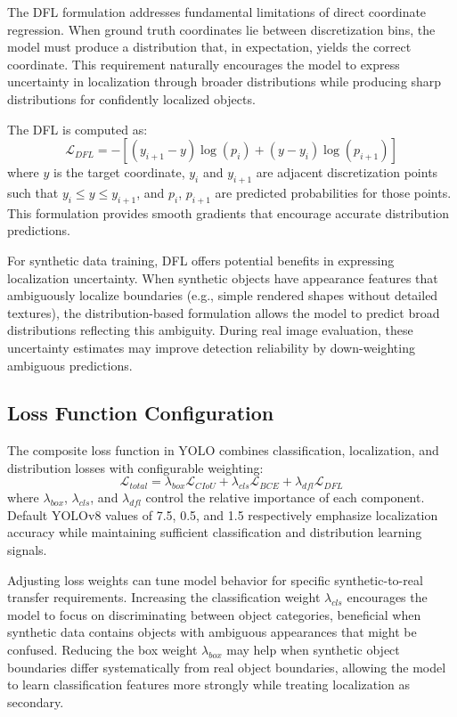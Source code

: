 The DFL formulation addresses fundamental limitations of direct coordinate regression. When ground truth coordinates lie between discretization bins, the model must produce a distribution that, in expectation, yields the correct coordinate. This requirement naturally encourages the model to express uncertainty in localization through broader distributions while producing sharp distributions for confidently localized objects.

The DFL is computed as:
\begin{equation}
\mathcal{L}_{DFL} = -[(y_{i+1} - y) \log(p_i) + (y - y_i) \log(p_{i+1})]
\end{equation}
where $y$ is the target coordinate, $y_i$ and $y_{i+1}$ are adjacent discretization points such that $y_i \leq y \leq y_{i+1}$, and $p_i$, $p_{i+1}$ are predicted probabilities for those points. This formulation provides smooth gradients that encourage accurate distribution predictions.

For synthetic data training, DFL offers potential benefits in expressing localization uncertainty. When synthetic objects have appearance features that ambiguously localize boundaries (e.g., simple rendered shapes without detailed textures), the distribution-based formulation allows the model to predict broad distributions reflecting this ambiguity. During real image evaluation, these uncertainty estimates may improve detection reliability by down-weighting ambiguous predictions.

\subsection{Loss Function Configuration}

The composite loss function in YOLO combines classification, localization, and distribution losses with configurable weighting:
\begin{equation}
\mathcal{L}_{total} = \lambda_{box} \mathcal{L}_{CIoU} + \lambda_{cls} \mathcal{L}_{BCE} + \lambda_{dfl} \mathcal{L}_{DFL}
\end{equation}
where $\lambda_{box}$, $\lambda_{cls}$, and $\lambda_{dfl}$ control the relative importance of each component. Default YOLOv8 values of 7.5, 0.5, and 1.5 respectively emphasize localization accuracy while maintaining sufficient classification and distribution learning signals.

Adjusting loss weights can tune model behavior for specific synthetic-to-real transfer requirements. Increasing the classification weight $\lambda_{cls}$ encourages the model to focus on discriminating between object categories, beneficial when synthetic data contains objects with ambiguous appearances that might be confused. Reducing the box weight $\lambda_{box}$ may help when synthetic object boundaries differ systematically from real object boundaries, allowing the model to learn classification features more strongly while treating localization as secondary.

